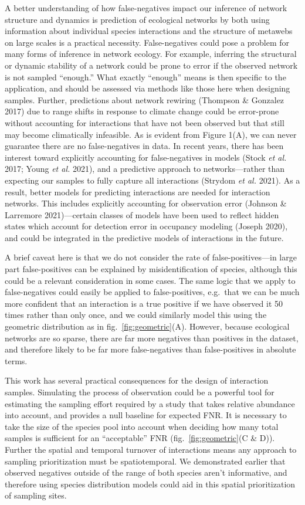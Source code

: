 \documentclass[11pt]{article}
\begin{document}
A better understanding of how false-negatives impact our inference of
network structure and dynamics is prediction of ecological networks by
both using information about individual species interactions and the
structure of metawebs on large scales is a practical necessity.
False-negatives could pose a problem for many forms of inference in
network ecology. For example, inferring the structural or dynamic
stability of a network could be prone to error if the observed network
is not sampled ``enough.'' What exactly ``enough'' means is then
specific to the application, and should be assessed via methods like
those here when designing samples. Further, predictions about network
rewiring (Thompson \& Gonzalez 2017) due to range shifts in response to
climate change could be error-prone without accounting for interactions
that have not been observed but that still may become climatically
infeasible. As is evident from Figure 1(A), we can never guarantee there
are no false-negatives in data. In recent years, there has been interest
toward explicitly accounting for false-negatives in models (Stock
\emph{et al.} 2017; Young \emph{et al.} 2021), and a predictive approach
to networks---rather than expecting our samples to fully capture all
interactions (Strydom \emph{et al.} 2021). As a result, better models
for predicting interactions are needed for interaction networks. This
includes explicitly accounting for observation error (Johnson \&
Larremore 2021)---certain classes of models have been used to reflect
hidden states which account for detection error in occupancy modeling
(Joseph 2020), and could be integrated in the predictive models of
interactions in the future.

A brief caveat here is that we do not consider the rate of
false-positives---in large part false-positives can be explained by
misidentification of species, although this could be a relevant
consideration in some cases. The same logic that we apply to
false-negatives could easily be applied to false-positives, e.g.~that we
can be much more confident that an interaction is a true positive if we
have observed it 50 times rather than only once, and we could similarly
model this using the geometric distribution as in
fig.~\ref{fig:geometric}(A). However, because ecological networks are so
sparse, there are far more negatives than positives in the dataset, and
therefore likely to be far more false-negatives than false-positives in
absolute terms.

This work has several practical consequences for the design of
interaction samples. Simulating the process of observation could be a
powerful tool for estimating the sampling effort required by a study
that takes relative abundance into account, and provides a null baseline
for expected FNR. It is necessary to take the size of the species pool
into account when deciding how many total samples is sufficient for an
``acceptable'' FNR (fig.~\ref{fig:geometric}(C \& D)). Further the
spatial and temporal turnover of interactions means any approach to
sampling prioritization must be spatiotemporal. We demonstrated earlier
that observed negatives outside of the range of both species aren't
informative, and therefore using species distribution models could aid
in this spatial prioritization of sampling sites.
\end{document}
